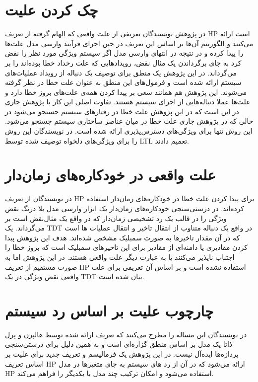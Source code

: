\section{چک کردن علیت}
در پژوهش 
\cite{causality-checking}
نویسندگان تعریفی از علت‌ واقعی که الهام گرفته از تعریف 
HP
است ارائه می‌کنند و الگوریتم آن‌ها بر اساس این تعریف در حین اجرای فرآیند وارسی مدل
علت‌ها را پیدا کرده و در نتیجه در انتهای وارسی مدل اگر سیستم ویژگی مورد نظر را نقض کرد به جای برگرداندن یک مثال نقض، رویداد‌هایی که علت رخداد خطا بوده‌اند را بر می‌گرداند.
در این پژوهش یک منطق برای توصیف یک دنباله از رویداد عملیات‌های سیستم ارائه شده است و فرمول‌های این منطق به عنوان علت خطا در نظر گرفته می‌شوند. 
این پژوهش هم همانند
\cite{chockler}
سعی بر پیدا کردن همه‌ی علت‌های بروز خطا دارد و علت‌ها عملا دنباله‌هایی از اجرای سیستم هستند. 
تفاوت اصلی این کار با پژوهش جاری در این است که در این پژوهش علت خطا در رفتارهای سیستم جستجو می‌شود در حالی که در پژوهش جاری علت خطا در میان عناصر ساختاری سیستم جستجو می‌شود.
این روش تنها برای ویژگی‌های دسترس‌پذیری ارائه شده است.
در
\cite{Caltais-LTL}
نویسندگان این روش‌ را برای ویژگی‌های دلخواه توصیف شده توسط
LTL
تعمیم دادند.

\section{علت واقعی در خودکاره‌های زمان‌دار}
در
\cite{kolbl2020dynamic}
نویسندگان از تعریف 
HP
برای پیدا کردن علت خطا در خودکاره‌های زمان‌دار
استفاده کرده‌اند.
در درستی‌سنجی خودکاره‌های زمان‌دار یک ابزار وارسی مدل بلا درنگ نقض ویژگی‌ را در قالب یک رد تشخیصی زمان‌دار 
که در واقع یک مثال‌نقض است بر می‌گرداند.
یک 
TDT
در واقع یک دنباله متناوب از انتقال تاخیر
و
انتقال عملیات
ها است که در آن مقدار تاخیر‌ها به صورت سمبلیک مشخص شده‌اند.
هدف این پژوهش پیدا کردن مقادیری یا دامنه‌ای از مقادیر برای این تاخیر‌های سمبلیک است که بروز خطا را اجتناب ناپذیر می‌کنند یا به عبارت دیگر علت واقعی هستند.
در این پژوهش اما به صورت مستقیم از تعریف 
HP
استفاده نشده است و بر اساس آن تعریفی برای علت واقعی نقض ویژگی در یک 
TDT
بیان شده است.

\section{چارچوب علیت بر اساس رد سیستم}
در 
\cite{gossler2013general}
نویسندگان این مساله را مطرح می‌کنند که تعریف ارائه شده توسط هالپرن و پرل ذاتا یک مدل بر اساس منطق گزاره‌ای
است و به همین دلیل برای درستی‌سنجی پردازه‌ها ایده‌آل نیست.
در این پژوهش یک فرمالیسم و تعریف جدید برای علیت بر اساس تعریف 
HP
ارائه می‌شود که در آن از رد‌
های سیستم به جای متغیر‌ها در مدل 
HP
استفاده می‌شود و امکان ترکیب
چند مدل با یکدیگر را فراهم می‌کند.


